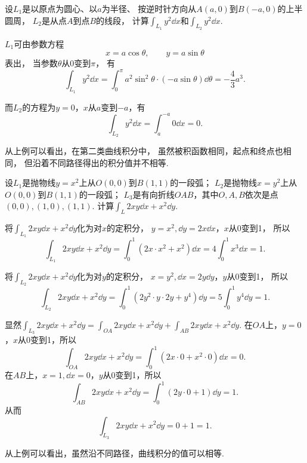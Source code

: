 \begin{example}
设\(L_1\)是以原点为圆心、以\(a\)为半径、
按逆时针方向从\(A(a,0)\)到\(B(-a,0)\)的上半圆周，
\(L_2\)是从点\(A\)到点\(B\)的线段，
计算\(\int_{L_1} y^2 \dd{x}\)和\(\int_{L_2} y^2 \dd{x}\).
\begin{solution}
\(L_1\)可由参数方程\begin{equation*}
	x = a \cos\theta,
	\qquad
	y = a \sin\theta
\end{equation*}表出，
当参数\(\theta\)从\(0\)变到\(\pi\)，
有\begin{equation*}
	\int_{L_1} y^2 \dd{x}
	= \int_0^\pi a^2 \sin^2 \theta \cdot (-a \sin\theta) \dd{\theta}
	= -\frac{4}{3} a^3.
\end{equation*}

而\(L_2\)的方程为\(y=0\)，\(x\)从\(a\)变到\(-a\)，有\begin{equation*}
	\int_{L_2} y^2 \dd{x} = \int_a^{-a} 0 \dd{x} = 0.
\end{equation*}
\end{solution}
\end{example}
从上例可以看出，在第二类曲线积分中，
虽然被积函数相同，起点和终点也相同，
但沿着不同路径得出的积分值并不相等.

\begin{example}
设\(L_1\)是抛物线\(y=x^2\)上从\(O(0,0)\)到\(B(1,1)\)的一段弧；
\(L_2\)是抛物线\(x=y^2\)上从\(O(0,0)\)到\(B(1,1)\)的一段弧；
\(L_3\)是有向折线\(OAB\)，其中\(O,A,B\)依次是点\((0,0),(1,0),(1,1)\).
计算\(\int_L 2xy\dd{x}+x^2\dd{y}\).
\begin{solution}
将\(\int_{L_1} 2xy\dd{x}+x^2\dd{y}\)化为对\(x\)的定积分，
\(y=x^2, \dd{y}=2x\dd{x}\)，\(x\)从0变到1，
所以\begin{equation*}
	\int_{L_1} 2xy\dd{x}+x^2\dd{y}
	= \int_0^1 (2x \cdot x^2 + x^2) \dd{x}
	= 4 \int_0^1 x^3 \dd{x} = 1.
\end{equation*}

将\(\int_{L_2} 2xy\dd{x}+x^2\dd{y}\)化为对\(y\)的定积分，
\(x=y^2, \dd{x}=2y\dd{y}\)，\(y\)从0变到1，
所以\begin{equation*}
	\int_{L_2} 2xy\dd{x}+x^2\dd{y}
	= \int_0^1 (2y^2 \cdot y \cdot 2y + y^4) \dd{y}
	= 5 \int_0^1 y^4 \dd{y} = 1.
\end{equation*}

显然\(\int_{L_3} 2xy\dd{x}+x^2\dd{y}
= \int_{OA} 2xy\dd{x}+x^2\dd{y}
+ \int_{AB} 2xy\dd{x}+x^2\dd{y}\).
在\(OA\)上，\(y=0\)，\(x\)从0变到1，所以\begin{equation*}
	\int_{OA} 2xy\dd{x}+x^2\dd{y}
	= \int_0^1 (2x\cdot0+x^2\cdot0) \dd{x} = 0.
\end{equation*}
在\(AB\)上，\(x=1, \dd{x}=0\)，\(y\)从0变到1，所以\begin{equation*}
	\int_{AB} 2xy\dd{x}+x^2\dd{y}
	= \int_0^1 (2y\cdot0+1) \dd{y} = 1.
\end{equation*}
从而\begin{equation*}
	\int_{L_3} 2xy\dd{x}+x^2\dd{y} = 0 + 1 = 1.
\end{equation*}
\end{solution}
\end{example}
从上例可以看出，虽然沿不同路径，曲线积分的值可以相等.

